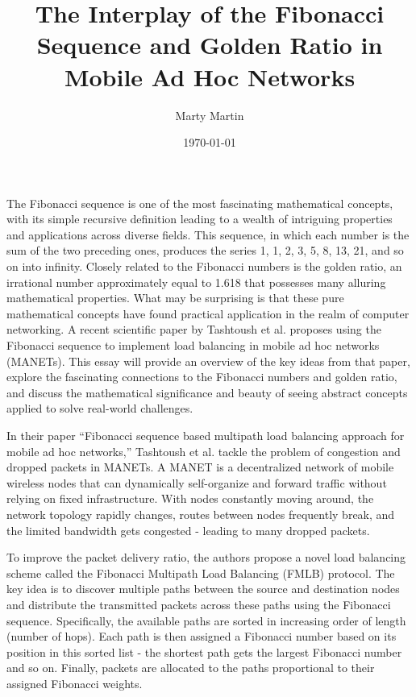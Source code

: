 \documentclass[12pt]{article}
\title{The Interplay of the Fibonacci Sequence and Golden Ratio in Mobile Ad Hoc Networks}
\author{Marty Martin}
\date{\today}
\begin{document}
\maketitle
\thispagestyle{empty}
\clearpage

\setcounter{page}{1}
\doublespacing %

The Fibonacci sequence is one of the most fascinating mathematical concepts, with its simple recursive definition leading to a wealth of intriguing properties and applications across diverse fields. This sequence, in which each number is the sum of the two preceding ones, produces the series 1, 1, 2, 3, 5, 8, 13, 21, and so on into infinity. Closely related to the Fibonacci numbers is the golden ratio, an irrational number approximately equal to 1.618 that possesses many alluring mathematical properties. What may be surprising is that these pure mathematical concepts have found practical application in the realm of computer networking. A recent scientific paper by Tashtoush et al. proposes using the Fibonacci sequence to implement load balancing in mobile ad hoc networks (MANETs). This essay will provide an overview of the key ideas from that paper, explore the fascinating connections to the Fibonacci numbers and golden ratio, and discuss the mathematical significance and beauty of seeing abstract concepts applied to solve real-world challenges.

In their paper ``Fibonacci sequence based multipath load balancing approach for mobile ad hoc networks,'' Tashtoush et al. tackle the problem of congestion and dropped packets in MANETs. A MANET is a decentralized network of mobile wireless nodes that can dynamically self-organize and forward traffic without relying on fixed infrastructure. With nodes constantly moving around, the network topology rapidly changes, routes between nodes frequently break, and the limited bandwidth gets congested - leading to many dropped packets.

To improve the packet delivery ratio, the authors propose a novel load balancing scheme called the Fibonacci Multipath Load Balancing (FMLB) protocol. The key idea is to discover multiple paths between the source and destination nodes and distribute the transmitted packets across these paths using the Fibonacci sequence. Specifically, the available paths are sorted in increasing order of length (number of hops). Each path is then assigned a Fibonacci number based on its position in this sorted list - the shortest path gets the largest Fibonacci number and so on. Finally, packets are allocated to the paths proportional to their assigned Fibonacci weights.
\end{document}
